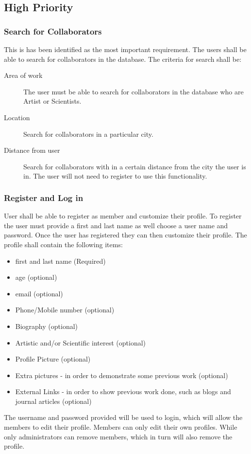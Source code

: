 \documentclass[a4paper,oneside,11pt]{report}
\begin{document}
\subsection{High Priority}
\subsubsection{Search for Collaborators} 
This is has been identified as the most important requirement. The users shall be able to search for collaborators in the database. The criteria for search shall be:
\begin{description}
	\item[Area of work] The user must be able to search for collaborators in the database who are Artist or Scientists.
	\item[Location] Search for collaborators in a particular city.
	\item[Distance from user] Search for collaborators with in a certain distance from the city the user is in. The user will not need to register to use this functionality.
\end{description}
	
\subsubsection{Register and Log in} 
 User shall be able to register as member and customize their profile. To register the user must provide a first and last name as well choose a user name and password. Once the user has registered they can then customize their profile. The profile shall contain the following items:
 \begin{itemize}
 \item first and last name (Required)
 \item age (optional)
 \item email (optional)
 \item Phone/Mobile number (optional)
 \item Biography (optional)
 \item Artistic and/or Scientific interest (optional)
 \item Profile Picture (optional)
 \item Extra pictures - in order to demonstrate some previous work (optional)
 \item External Links - in order to show previous work done, such as blogs and journal articles (optional)
 \end{itemize}
 The username and password provided will be used to login, which will allow the members to edit their profile.
 	Members can only edit their own profiles. While only administrators can remove members, which in turn will also remove the profile.
\end{document}
